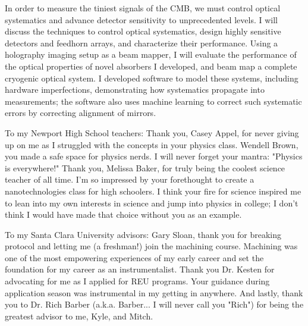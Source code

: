\documentclass{ucetd}
\begin{document}
In order to measure the tiniest signals of the CMB, we must control optical systematics and advance detector sensitivity to unprecedented levels. I will discuss the techniques to control optical systematics, design highly sensitive detectors and feedhorn arrays, and characterize their performance. Using a holography imaging setup as a beam mapper, I will evaluate the performance of the optical properties of novel absorbers I developed, and beam map a complete cryogenic optical system. I developed software to model these systems,  including hardware imperfections, demonstrating how systematics propagate into measurements; the software also uses machine learning to correct such systematic errors by correcting alignment of mirrors. 


\mainmatter











\appendix






\acknowledgments



To my Newport High School teachers:  Thank you, Casey Appel, for never giving up on me as I struggled with the concepts in your physics class.  Wendell Brown, you made a safe space for physics nerds.  I will never forget your mantra: "Physics is everywhere!"  Thank you, Melissa Baker, for truly being the coolest science teacher of all time.  I'm so impressed by your forethought to create a nanotechnologies class for high schoolers.  I think your fire for science inspired me to lean into my own interests in science and jump into physics in college;  I don't think I would have made that choice without you as an example.

To my Santa Clara University advisors: Gary Sloan, thank you for breaking protocol and letting me (a freshman!) join the machining course.  Machining was one of the most empowering experiences of my early career and set the foundation for my career as an instrumentalist.  Thank you Dr. Kesten for advocating for me as I applied for REU programs.  Your guidance during application season was instrumental in my getting in anywhere.  And lastly, thank you to Dr. Rich Barber (a.k.a. Barber... I will never call you "Rich") for being the greatest advisor to me, Kyle, and Mitch.  
\end{document}
